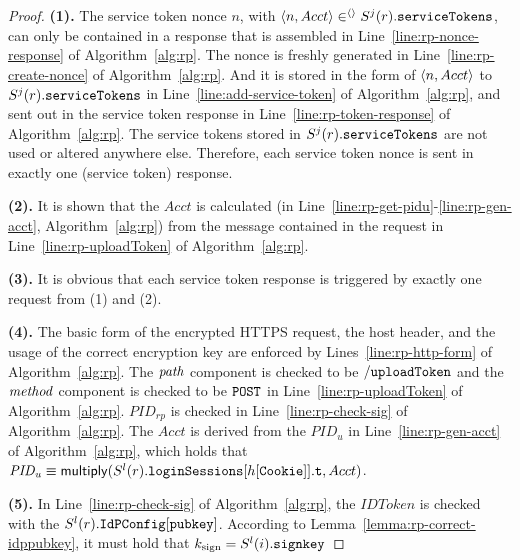 \begin{proof}
\textbf{(1).} The service token nonce $n$, with $\langle n, Acct\rangle \in^{\langle\rangle} S^j(r).\mathtt{serviceTokens}$, can only be contained in a response that is assembled in Line~\ref{line:rp-nonce-response} of Algorithm~\ref{alg:rp}. The nonce is freshly generated in Line~\ref{line:rp-create-nonce} of Algorithm~\ref{alg:rp}. And it is stored in the form of $\langle n, Acct\rangle$ to $S^j(r).\mathtt{serviceTokens}$ in Line~\ref{line:add-service-token} of Algorithm~\ref{alg:rp}, and sent out in the service token response in Line~\ref{line:rp-token-response} of Algorithm~\ref{alg:rp}. The service tokens stored in $S^j(r).\mathtt{serviceTokens}$ are not used or altered anywhere else. Therefore, each service token nonce is sent in exactly one (service token) response.

\textbf{(2).} It is shown that the $Acct$ is calculated (in Line~\ref{line:rp-get-pidu}-\ref{line:rp-gen-acct}, Algorithm~\ref{alg:rp}) from the message contained in the request in Line~\ref{line:rp-uploadToken} of Algorithm~\ref{alg:rp}. 

\textbf{(3).} It is obvious that each service token response is triggered by exactly one request from (1) and (2).

\textbf{(4).} The basic form of the encrypted HTTPS request, the host header, and the usage of the correct encryption key are enforced by Lines~\ref{line:rp-http-form} of Algorithm~\ref{alg:rp}. The $\mathit{path}$ component is checked to be $\mathtt{/uploadToken}$ and the $\mathit{method}$ component is checked to be $\mathtt{POST}$ in Line~\ref{line:rp-uploadToken} of Algorithm~\ref{alg:rp}. $PID_{rp}$ is checked in Line~\ref{line:rp-check-sig} of Algorithm~\ref{alg:rp}.  The $Acct$ is derived from the $PID_u$ in Line~\ref{line:rp-gen-acct} of Algorithm~\ref{alg:rp}, which holds that $\mathit{PID_{u}} \equiv \mathsf{multiply}(S^l(r).\mathtt{loginSessions}[h[\mathtt{Cookie}]].\mathtt{t}, Acct)$.

\textbf{(5).} In Line~\ref{line:rp-check-sig} of Algorithm~\ref{alg:rp}, the $IDToken$ is checked with the $S^l(r).\mathtt{IdPConfig}[\mathtt{pubkey}]$. According to Lemma~\ref{lemma:rp-correct-idppubkey}, it must hold that $k_\text{sign} = S^l(i).\mathtt{signkey}$
\end{proof}  
  
  


